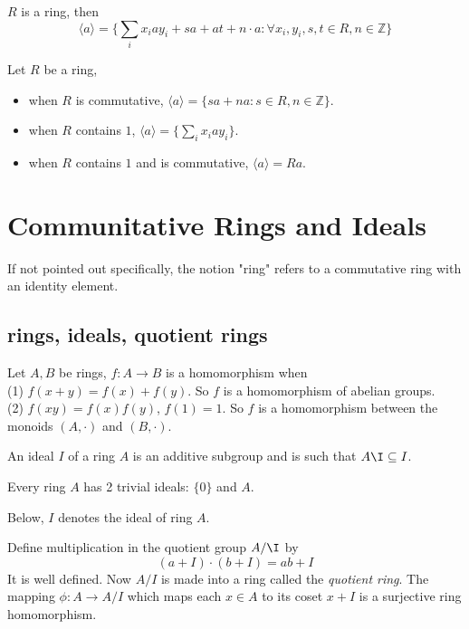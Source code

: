\documentclass[11pt,fleqn]{book} %
\begin{document}
\begin{CJK}{UTF8}{gkai}
\begin{theorem}
	$R$ is a ring, then 
	\[
		\langle a \rangle = \{\sum_i x_i a y_i + sa + at + n\cdot a : \forall x_i,y_i,s,t \in R, n\in \mathbb{Z}\}\]
\end{theorem}

\begin{corollary}
	Let $R$ be a ring,
	\begin{itemize}
		\item when $R$ is commutative, $\langle a \rangle = \{sa + na : s\in R, n \in \mathbb{Z}\}$.
		\item when $R$ contains $1$, $\langle a \rangle = \{\sum_i x_iay_i\}$.
		\item when $R$ contains $1$ and is commutative, $\langle a \rangle = Ra$.
	\end{itemize}
\end{corollary}
\chapter{Communitative Rings and Ideals}
If not pointed out specifically, the notion "ring" refers to a commutative ring with an identity element. 

\section{rings, ideals, quotient rings}
\begin{definition}
	 Let $A, B$ be rings, $f : A\to B$ is a homomorphism when \\
	(1) $f(x+y) = f(x) + f(y)$. So $f$ is a homomorphism of abelian groups. \\
	(2) $f(xy) = f(x)f(y)$, $f(1) = 1$. So $f$ is a homomorphism between the monoids $(A, \cdot)$ and $(B, \cdot)$.

\end{definition}
\begin{definition}
	 An ideal $I$ of a ring $A$ is an additive subgroup and is such that $A\I \subseteq I$.
\end{definition}
\begin{example}
	Every ring $A$ has 2 trivial ideals: $\{0\}$ and $A$.
\end{example}

Below, $I$ denotes the ideal of ring $A$.
\begin{definition}
	 Define multiplication in the quotient group $A/\I$ by\\
	\[(a + I) \cdot (b + I) = ab + I\]
	It is well defined. Now $A/I$ is made into a ring called the {\it quotient ring}. The mapping $\phi: A \to A/I$ which maps each $x \in A$ to its coset $x + I$ is a surjective ring homomorphism.
\end{definition}


\end{CJK}
\end{document}
